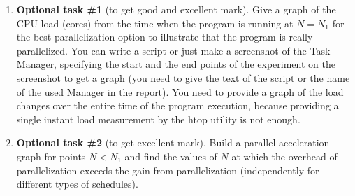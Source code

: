 {\begin{enumerate}
		\item\textbf{Optional task \#1} (to get good and excellent mark). Give a graph of the CPU load (cores) from the time when the program is running at $N=N_1$ for the best parallelization option to illustrate that the program is really parallelized. You can write a script or just make a screenshot of the Task Manager, specifying the start and the end points of the experiment on the screenshot to get a graph (you need to give the text of the script or the name of the used Manager in the report). You need to provide a graph of the load changes over the entire time of the program execution, because providing a single instant load measurement by the htop utility is not enough.
		\item\textbf{Optional task \#2} (to get excellent mark). Build a parallel acceleration graph for points $N<N_1$ and find the values of $N$ at which the overhead of parallelization exceeds the gain from parallelization (independently for different types of schedules).
	\end{enumerate}
}